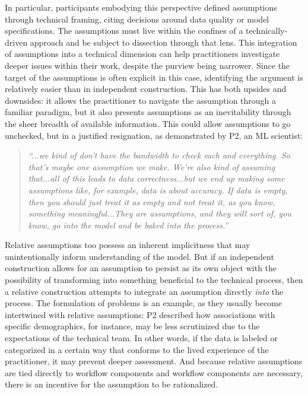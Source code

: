 In particular, participants embodying this perspective defined assumptions through technical framing, citing decisions around data quality or model specifications. The assumptions must live within the confines of a technically-driven approach and be subject to dissection through that lens. This integration of assumptions into a technical dimension can help practitioners investigate deeper issues within their work, despite the purview being narrower. Since the target of the assumptions is often explicit in this case, identifying the argument is relatively easier than in independent construction. This has both upsides and downsides: it allows the practitioner to navigate the assumption through a familiar paradigm, but it also presents assumptions as an inevitability through the sheer breadth of available information. This could allow assumptions to go unchecked, but in a justified resignation, as demonstrated by P2, an ML scientist:

\begin{quote}
\textit{``...we kind of don't have the bandwidth to check each and everything. So that's maybe one assumption we make. We're also kind of assuming that...all of this leads to data correctness...but we end up making some assumptions like, for example, data is about accuracy. If data is empty, then you should just treat it as empty and not treat it, as you know, something meaningful...They are assumptions, and they will sort of, you know, go into the model and be baked into the process.''}
\end{quote}


Relative assumptions too possess an inherent implicitness that may unintentionally inform understanding of the model. But if an independent construction allows for an assumption to persist as its own object with the possibility of transforming into something beneficial to the technical process, then a relative construction attempts to integrate an assumption directly \textit{into} the process. The formulation of problems is an example, as they usually become intertwined with relative assumptions: P2 described how associations with specific demographics, for instance, may be less scrutinized due to the expectations of the technical team. In other words, if the data is labeled or categorized in a certain way that conforms to the lived experience of the practitioner, it may prevent deeper assessment. And because relative assumptions are tied directly to workflow components and workflow components are necessary, there is an incentive for the assumption to be rationalized.

